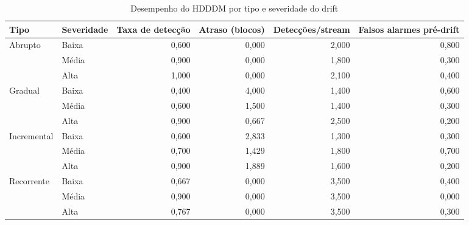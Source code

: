 \begin{table}[htbp]
\centering
\small
\caption{Desempenho do HDDDM por tipo e severidade do drift}
\label{tab:deteccao}
\begin{adjustbox}{max width=\textwidth}
\begin{tabular}{llrrrr}
\toprule
Tipo & Severidade & Taxa de detecção & Atraso (blocos) & Detecções/stream & Falsos alarmes pré-drift \\
\midrule
Abrupto & Baixa & 0,600 & 0,000 & 2,000 & 0,800 \\
 & Média & 0,900 & 0,000 & 1,800 & 0,300 \\
 & Alta & 1,000 & 0,000 & 2,100 & 0,400 \\
Gradual & Baixa & 0,400 & 4,000 & 1,400 & 0,600 \\
 & Média & 0,600 & 1,500 & 1,400 & 0,300 \\
 & Alta & 0,900 & 0,667 & 2,500 & 0,200 \\
Incremental & Baixa & 0,600 & 2,833 & 1,300 & 0,300 \\
 & Média & 0,700 & 1,429 & 1,800 & 0,700 \\
 & Alta & 0,900 & 1,889 & 1,600 & 0,200 \\
Recorrente & Baixa & 0,667 & 0,000 & 3,500 & 0,400 \\
 & Média & 0,900 & 0,000 & 3,500 & 0,000 \\
 & Alta & 0,767 & 0,000 & 3,500 & 0,300 \\
\bottomrule
\end{tabular}
\end{adjustbox}
\end{table}

